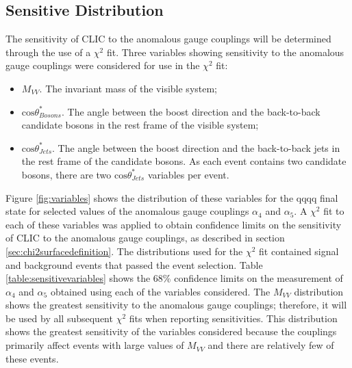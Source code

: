 \subsection{Sensitive Distribution}
The sensitivity of CLIC to the anomalous gauge couplings will be determined through the use of a $\chi^{2}$ fit.  Three variables showing sensitivity to the anomalous gauge couplings were considered for use in the $\chi^{2}$ fit:
\begin{itemize}
\item \textbf{$M_{VV}$}.  The invariant mass of the visible system;
\item \textbf{$\text{cos}\theta^{*}_{Bosons}$}.  The angle between the boost direction and the back-to-back candidate bosons in the rest frame of the visible system;
\item \textbf{$\text{cos}\theta^{*}_{Jets}$}.  The angle between the boost direction and the back-to-back jets in the rest frame of the candidate bosons.  As each event contains two candidate bosons, there are two $\text{cos}\theta^{*}_{Jets}$ variables per event. 
\end{itemize}

Figure \ref{fig:variables} shows the distribution of these variables for the  \nu{\nu}qqqq final state for selected values of the anomalous gauge couplings $\alpha_{4}$ and $\alpha_{5}$.  A $\chi^{2}$ fit to each of these variables was applied to obtain confidence limits on the sensitivity of CLIC to the anomalous gauge couplings, as described in section \ref{sec:chi2surfacedefinition}.  The distributions used for the $\chi^{2}$ fit contained signal and background events that passed {the} event selection.  Table \ref{table:sensitivevariables} shows the 68\% confidence limits on the measurement of $\alpha_{4}$ and $\alpha_{5}$ obtained using each of the variables considered.  The $M_{VV}$ distribution shows the greatest {sensitivity} to the anomalous gauge couplings; therefore, it will be used by all subsequent $\chi^{2}$ fits when reporting sensitivities.  This distribution shows the greatest sensitivity of the variables considered because the couplings primarily affect events with large values of $M_{VV}$ and there are relatively few of these events.    

